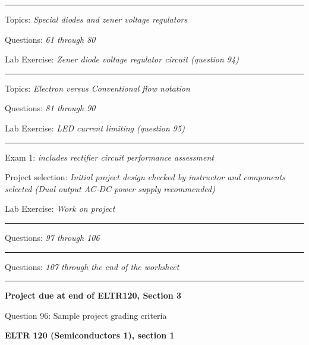 \vskip 10pt
\hrule \vskip 5pt
\noindent
{}

\hskip 10pt Topics: {\it Special diodes and zener voltage regulators}
 
\hskip 10pt Questions: {\it 61 through 80}
 
\hskip 10pt Lab Exercise: {\it Zener diode voltage regulator circuit (question 94)}
 
\vskip 10pt
\hrule \vskip 5pt
\noindent
{}

\hskip 10pt Topics: {\it Electron versus Conventional flow notation}
 
\hskip 10pt Questions: {\it 81 through 90}
 
\hskip 10pt Lab Exercise: {\it LED current limiting (question 95)}
 
\vskip 10pt
\hrule \vskip 5pt
\noindent
{}

\hskip 10pt Exam 1: {\it includes rectifier circuit performance assessment}
 
\hskip 10pt Project selection: {\it Initial project design checked by instructor and components selected (Dual output AC-DC power supply  recommended)}
  
\hskip 10pt Lab Exercise: {\it Work on project}

\vskip 10pt
\hrule \vskip 5pt
\noindent
{}

\hskip 10pt Questions: {\it 97 through 106}
 
\vskip 10pt
\hrule \vskip 5pt
\noindent
{}

\hskip 10pt Questions: {\it 107 through the end of the worksheet}
 
\vskip 10pt
\hrule \vskip 5pt
\noindent
{}

\hskip 10pt {\bf Project due at end of ELTR120, Section 3}
 
\hskip 10pt Question 96: Sample project grading criteria
 
\vskip 10pt











\vfil \eject

\centerline{\bf ELTR 120 (Semiconductors 1), section 1} \bigskip 
 
